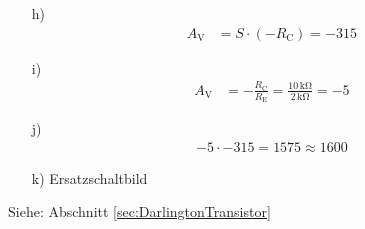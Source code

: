 {\begin{itemize}
            \item[h)]
                  \begin{align*}
                        A_\mathrm{V} & = S \cdot (-R_\mathrm{C}) = -315
                  \end{align*}
                  
            \item[i)]
                  \begin{align*}
                        A_\mathrm{V} & = -\frac{R_\mathrm{C}}{R_\mathrm{E}} = \frac{10\,\mathrm{k\Omega}}{2\,\mathrm{k\Omega}} = -5
                  \end{align*}
                  
            \item[j)]
                  \begin{align*}
                        -5 \cdot -315 = 1575 \approx 1600
                  \end{align*}
                  
            \item[k)] Ersatzschaltbild\\
                  \begin{minipage}{\linewidth}
                        \begin{figure}[H]
                              \centering
                              
                        \end{figure}
                  \end{minipage}
      \end{itemize}
      
      Siehe: Abschnitt \ref{sec:DarlingtonTransistor}
}